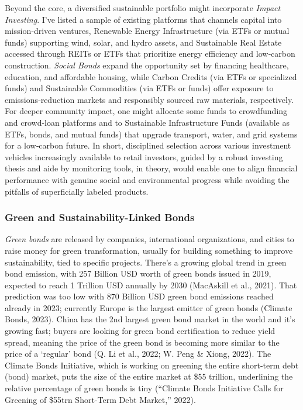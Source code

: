 \documentclass[
  12pt,
  letterpaper,
  DIV=11,
  numbers=noendperiod]{scrartcl}
\begin{document}
\let\pandoctableshortcapt\relax

Beyond the core, a diversified sustainable portfolio might incorporate
\emph{Impact Investing}. I've listed a sample of existing platforms that
channels capital into mission‑driven ventures, Renewable Energy
Infrastructure (via ETFs or mutual funds) supporting wind, solar, and
hydro assets, and Sustainable Real Estate accessed through REITs or ETFs
that prioritize energy efficiency and low‑carbon construction.
\emph{Social Bonds} expand the opportunity set by financing healthcare,
education, and affordable housing, while Carbon Credits (via ETFs or
specialized funds) and Sustainable Commodities (via ETFs or funds) offer
exposure to emissions‑reduction markets and responsibly sourced raw
materials, respectively. For deeper community impact, one might allocate
some funds to crowdfunding and crowd-loan platforms and to Sustainable
Infrastructure Funds (available as ETFs, bonds, and mutual funds) that
upgrade transport, water, and grid systems for a low‑carbon future. In
short, disciplined selection across various investment vehicles
increasingly available to retail investors, guided by a robust investing
thesis and aide by monitoring tools, in theory, would enable one to
align financial performance with genuine social and environmental
progress while avoiding the pitfalls of superficially labeled products.

\subsubsection{Green and Sustainability-Linked
Bonds}\label{green-and-sustainability-linked-bonds}

\emph{Green bonds} are released by companies, international
organizations, and cities to raise money for green transformation,
usually for building something to improve sustainability, tied to
specific projects. There's a growing global trend in green bond
emission, with 257 Billion USD worth of green bonds issued in 2019,
expected to reach 1 Trillion USD annually by 2030 (MacAskill et al.,
2021). That prediction was too low with 870 Billion USD green bond
emissions reached already in 2023; currently Europe is the largest
emitter of green bonds (Climate Bonds, 2023). China has the 2nd largest
green bond market in the world and it's growing fast; buyers are looking
for green bond certification to reduce yield spread, meaning the price
of the green bond is becoming more similar to the price of a `regular'
bond (Q. Li et al., 2022; W. Peng \& Xiong, 2022). The Climate Bonds
Initiative, which is working on greening the entire short-term debt
(bond) market, puts the size of the entire market at \$55 trillion,
underlining the relative percentage of green bonds is tiny ({``Climate
{Bonds Initiative} Calls for Greening of \$55trn Short-Term Debt
Market,''} 2022).
\end{document}
